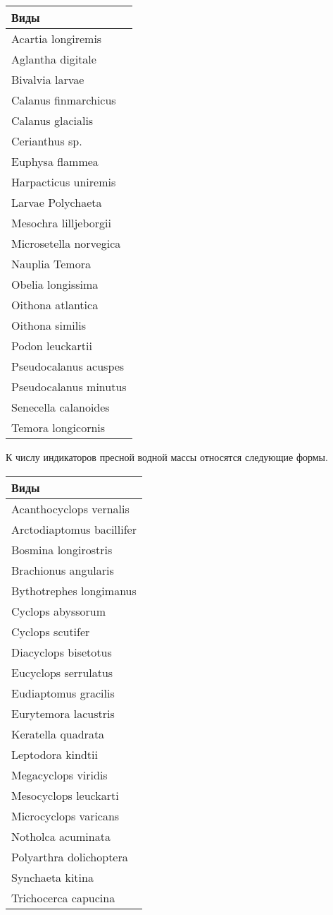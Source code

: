 \documentclass[
]{article}
\begin{document}
\begin{longtable}[]{@{}l@{}}
\toprule
Виды \\
\midrule
\endhead
Acartia longiremis \\
Aglantha digitale \\
Bivalvia larvae \\
Calanus finmarchicus \\
Calanus glacialis \\
Cerianthus sp. \\
Euphysa flammea \\
Harpacticus uniremis \\
Larvae Polychaeta \\
Mesochra lilljeborgii \\
Microsetella norvegica \\
Nauplia Temora \\
Obelia longissima \\
Oithona atlantica \\
Oithona similis \\
Podon leuckartii \\
Pseudocalanus acuspes \\
Pseudocalanus minutus \\
Senecella calanoides \\
Temora longicornis \\
\bottomrule
\end{longtable}

К числу индикаторов пресной водной массы относятся следующие формы.

\begin{longtable}[]{@{}l@{}}
\toprule
Виды \\
\midrule
\endhead
Acanthocyclops vernalis \\
Arctodiaptomus bacillifer \\
Bosmina longirostris \\
Brachionus angularis \\
Bythotrephes longimanus \\
Cyclops abyssorum \\
Cyclops scutifer \\
Diacyclops bisetotus \\
Eucyclops serrulatus \\
Eudiaptomus gracilis \\
Eurytemora lacustris \\
Keratella quadrata \\
Leptodora kindtii \\
Megacyclops viridis \\
Mesocyclops leuckarti \\
Microcyclops varicans \\
Notholca acuminata \\
Polyarthra dolichoptera \\
Synchaeta kitina \\
Trichocerca capucina \\
\bottomrule
\end{longtable}
\end{document}
